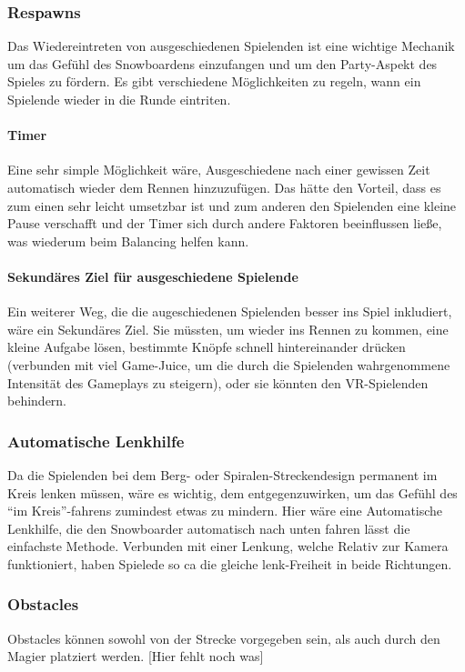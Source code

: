 \subsubsection{Respawns}
Das Wiedereintreten von ausgeschiedenen Spielenden ist eine wichtige Mechanik um das Gefühl des Snowboardens einzufangen und um den Party-Aspekt des Spieles zu fördern. Es gibt verschiedene Möglichkeiten zu regeln, wann ein Spielende wieder in die Runde eintriten.

\paragraph{Timer}
Eine sehr simple Möglichkeit wäre, Ausgeschiedene nach einer gewissen Zeit automatisch wieder dem Rennen hinzuzufügen. Das hätte den Vorteil, dass es zum einen sehr leicht umsetzbar ist und zum anderen den Spielenden eine kleine Pause verschafft und der Timer sich durch andere Faktoren beeinflussen ließe, was wiederum beim Balancing helfen kann.

\paragraph{Sekundäres Ziel für ausgeschiedene Spielende}
Ein weiterer Weg, die die augeschiedenen Spielenden besser ins Spiel inkludiert, wäre ein Sekundäres Ziel. Sie müssten, um wieder ins Rennen zu kommen, eine kleine Aufgabe lösen, bestimmte Knöpfe schnell hintereinander drücken (verbunden mit viel Game-Juice, um die durch die Spielenden wahrgenommene Intensität des Gameplays zu steigern), oder sie könnten den VR-Spielenden behindern.

\subsubsection{Automatische Lenkhilfe}
Da die Spielenden bei dem Berg- oder Spiralen-Streckendesign permanent im Kreis lenken müssen, wäre es wichtig, dem entgegenzuwirken, um das Gefühl des "`im Kreis"'-fahrens zumindest etwas zu mindern. Hier wäre eine Automatische Lenkhilfe, die den Snowboarder automatisch nach unten fahren lässt die einfachste Methode. Verbunden mit einer Lenkung, welche Relativ zur Kamera funktioniert, haben Spielede so ca die gleiche lenk-Freiheit in beide Richtungen.

\subsubsection{Obstacles}
Obstacles können sowohl von der Strecke vorgegeben sein, als auch durch den Magier platziert werden.
[Hier fehlt noch was]

